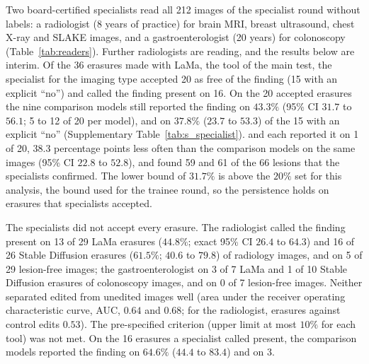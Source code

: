 Two board-certified specialists read all 212 images of the specialist round without labels: a radiologist (8 years of practice) for brain MRI, breast ultrasound, chest X-ray and SLAKE images, and a gastroenterologist (20 years) for colonoscopy (Table~\ref{tab:readers}).
Further radiologists are reading, and the results below are interim.
Of the 36 erasures made with LaMa, the tool of the main test, the specialist for the imaging type accepted 20 as free of the finding (15 with an explicit ``no'') and called the finding present on 16.
On the 20 accepted erasures the nine comparison models still reported the finding on $43.3\%$ (95\% CI $31.7$ to $56.1$; 5 to 12 of 20 per model), and on $37.8\%$ ($23.7$ to $53.3$) of the 15 with an explicit ``no'' (Supplementary Table~\ref{tab:s_specialist}).
\ms{} and \msn{} each reported it on 1 of 20, $38.3$ percentage points less often than the comparison models on the same images (95\% CI $22.8$ to $52.8$), and found 59 and 61 of the 66 lesions that the specialists confirmed.
The lower bound of $31.7\%$ is above the $20\%$ set for this analysis, the bound used for the trainee round, so the persistence holds on erasures that specialists accepted.

The specialists did not accept every erasure.
The radiologist called the finding present on 13 of 29 LaMa erasures ($44.8\%$; exact 95\% CI $26.4$ to $64.3$) and 16 of 26 Stable Diffusion erasures ($61.5\%$; $40.6$ to $79.8$) of radiology images, and on 5 of 29 lesion-free images; the gastroenterologist on 3 of 7 LaMa and 1 of 10 Stable Diffusion erasures of colonoscopy images, and on 0 of 7 lesion-free images.
Neither separated edited from unedited images well (area under the receiver operating characteristic curve, AUC, $0.64$ and $0.68$; for the radiologist, erasures against control edits $0.53$).
The pre-specified criterion (upper limit at most $10\%$ for each tool) was not met.
On the 16 erasures a specialist called present, the comparison models reported the finding on $64.6\%$ ($44.4$ to $83.4$) and \ms{} on 3.

